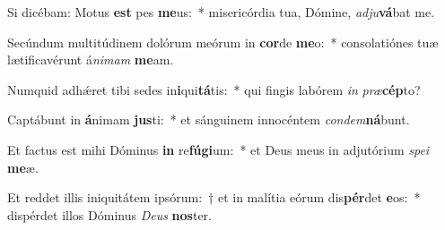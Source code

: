 \item Si dicébam: Motus \textbf{est} pes \textbf{me}us:~* misericórdia tua, Dómine, \textit{ad}\textit{ju}\textbf{vá}bat me.
\item Secúndum multitúdinem dolórum meórum in \textbf{cor}de \textbf{me}o:~* consolatiónes tuæ lætificavérunt á\textit{ni}\textit{mam} \textbf{me}am.
\item Numquid adhǽret tibi sedes in\textbf{i}qui\textbf{tá}tis:~* qui fingis labórem \textit{in} \textit{præ}\textbf{cép}to?
\item Captábunt in \textbf{á}nimam \textbf{jus}ti:~* et sánguinem innocéntem \textit{con}\textit{dem}\textbf{ná}bunt.
\item Et factus est mihi Dóminus \textbf{in} re\textbf{fú}\textbf{gi}um:~* et Deus meus in adjutórium \textit{spe}\textit{i} \textbf{me}æ.
\item Et reddet illis iniquitátem ipsórum:~† et in malítia eórum dis\textbf{pér}det \textbf{e}os:~* dispérdet illos Dóminus \textit{De}\textit{us} \textbf{nos}ter.
